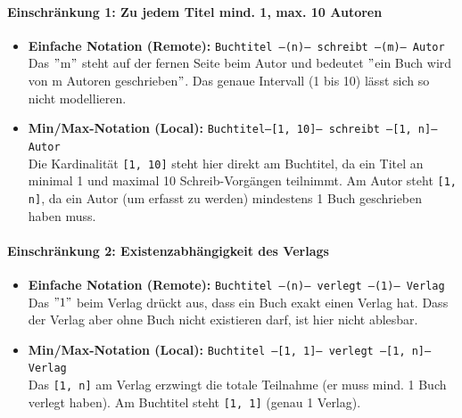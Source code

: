 \documentclass[12pt]{scrartcl}
\begin{document}
    \paragraph*{Einschränkung 1: Zu jedem Titel mind. 1, max. 10 Autoren}
    \begin{itemize}
        \item \textbf{Einfache Notation (Remote):} \texttt{Buchtitel ---(n)--- schreibt ---(m)--- Autor} \\
        Das \("\)m\("\) steht auf der fernen Seite beim Autor und bedeutet \("\)ein Buch wird von m Autoren geschrieben\("\). Das genaue Intervall (1 bis 10) lässt sich so nicht modellieren.
        \item \textbf{Min/Max-Notation (Local):} \texttt{Buchtitel---[1, 10]--- schreibt ---[1, n]--- Autor} \\
        Die Kardinalität \texttt{[1, 10]} steht hier direkt am Buchtitel, da ein Titel an minimal 1 und maximal 10 Schreib-Vorgängen teilnimmt. Am Autor steht \texttt{[1, n]}, da ein Autor (um erfasst zu werden) mindestens 1 Buch geschrieben haben muss.
    \end{itemize}

    \paragraph*{Einschränkung 2: Existenzabhängigkeit des Verlags}
    \begin{itemize}
        \item \textbf{Einfache Notation (Remote):} \texttt{Buchtitel ---(n)--- verlegt ---(1)--- Verlag} \\
        Das \("1"\) beim Verlag drückt aus, dass ein Buch exakt einen Verlag hat. Dass der Verlag aber ohne Buch nicht existieren darf, ist hier nicht ablesbar.
        \item \textbf{Min/Max-Notation (Local):} \texttt{Buchtitel ---[1, 1]--- verlegt ---[1, n]--- Verlag} \\
        Das \texttt{[1, n]} am Verlag erzwingt die totale Teilnahme (er muss mind. 1 Buch verlegt haben). Am Buchtitel steht  \texttt{[1, 1]} (genau 1 Verlag).
    \end{itemize}
\end{document}
